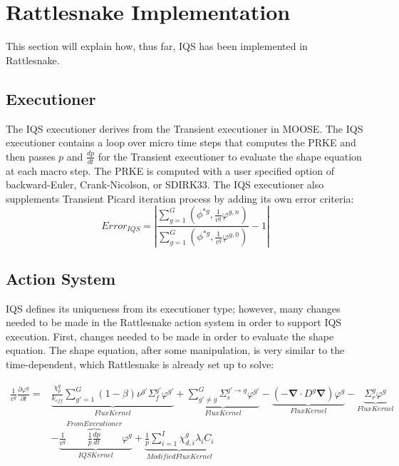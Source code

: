 \documentclass[12pt]{scrartcl}
\renewcommand{\div}{\bs{\nabla}\! \cdot \!}
\newcommand{\grad}{\bs{\nabla}}
\newcommand{\bs}[1]{\mathbf{#1}}
\newcommand{\keff}{k_\textit{eff}}
\newcommand{\be}{\begin{equation}}
\newcommand{\ee}{\end{equation}}
\begin{document}
\section{Rattlesnake Implementation}

This section will explain how, thus far, IQS has been implemented in Rattlesnake. 
 
\subsection{Executioner}
The IQS executioner derives from the Transient executioner in MOOSE.  The IQS executioner contains a loop over micro time steps that computes the PRKE and then passes $p$ and $\frac{dp}{dt}$ for the Transient executioner to evaluate the shape equation at each macro step.  The PRKE is computed with a user specified option of backward-Euler, Crank-Nicolson, or SDIRK33.   The IQS executioner also supplements Transient Picard iteration process by adding its own error criteria:
\be
Error_{IQS}=\left|\frac{\sum_{g=1}^G\left(\phi^{*g},\frac{1}{v^g}\varphi^{g,n}\right)}{\sum_{g=1}^G\left(\phi^{*g},\frac{1}{v^g}\varphi^{g,0}\right)}-1\right|
\ee

\subsection{Action System}
IQS defines its uniqueness from its executioner type; however, many changes needed to be made in the Rattlesnake action system in order to support IQS execution.   First, changes needed to be made in order to evaluate the shape equation.  The shape equation, after some manipulation, is very similar to the time-dependent, which Rattlesnake is already set up to solve:

\begin{align}
\frac{1}{v^g}\frac{\partial\varphi^g}{\partial t}=&\underbrace{\frac{\chi_p^g}{\keff} \sum_{g'=1}^G (1-\beta) \nu^{g'} \Sigma_f^{g'} \varphi^{g'}}_{Flux Kernel} + \underbrace{\sum_{g'\neq g}^G\Sigma_s^{g'\to g} \varphi^{g'}}_{Flux Kernel} - \underbrace{\left( -\div D^g \grad \right)\varphi^g}_{Flux Kernel} - \underbrace{\Sigma_r^g\varphi^g}_{Flux Kernel} \nonumber \\
& - \underbrace{\frac{1}{v^g} \overbrace{\frac{1}{p}\frac{dp}{dt}}^{From Executioner}\varphi^g}_{IQS Kernel}+\underbrace{\frac{1}{p}\sum_{i=1}^I\chi_{d,i}^g\lambda_iC_i}_{Modified Flux Kernel}
\end{align}
\end{document}
